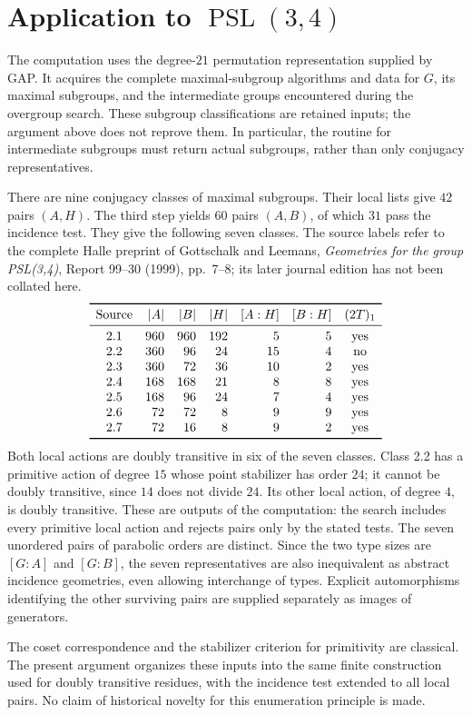 \documentclass[11pt]{article}
\begin{document}
\section*{Application to $\operatorname{PSL}(3,4)$}
The computation uses the degree-$21$ permutation representation supplied
by GAP. It acquires the complete maximal-subgroup algorithms and data for
$G$, its maximal subgroups, and the intermediate groups encountered during
the overgroup search. These subgroup classifications are retained inputs;
the argument above does not reprove them. In particular, the routine for
intermediate subgroups must return actual subgroups, rather than only
conjugacy representatives.

There are nine conjugacy classes of maximal subgroups. Their local lists
give $42$ pairs $(A,H)$. The third step yields $60$ pairs $(A,B)$, of which
$31$ pass the incidence test. They give the following seven classes.
The source labels refer to the complete Halle preprint of Gottschalk and
Leemans, \emph{Geometries for the group PSL(3,4)}, Report 99--30 (1999),
pp.~7--8; its later journal edition has not been collated here.
\[
\begin{array}{crrrrrc}
\toprule
\text{Source}&|A|&|B|&|H|&[A:H]&[B:H]&(2T)_1\\
\midrule
2.1&960&960&192&5&5&\mathrm{yes}\\
2.2&360&96&24&15&4&\mathrm{no}\\
2.3&360&72&36&10&2&\mathrm{yes}\\
2.4&168&168&21&8&8&\mathrm{yes}\\
2.5&168&96&24&7&4&\mathrm{yes}\\
2.6&72&72&8&9&9&\mathrm{yes}\\
2.7&72&16&8&9&2&\mathrm{yes}\\
\bottomrule
\end{array}
\]
Both local actions are doubly transitive in six of the seven classes.
Class 2.2 has a primitive action of degree $15$ whose point stabilizer
has order $24$; it cannot be doubly transitive, since $14$ does not
divide $24$. Its other local action, of degree $4$, is doubly transitive.
These are outputs of the computation: the search includes every primitive
local action and rejects pairs only by the stated tests. The seven
unordered pairs of parabolic orders are distinct. Since the two type
sizes are $[G:A]$ and $[G:B]$, the seven representatives are also
inequivalent as abstract incidence geometries, even allowing interchange
of types. Explicit automorphisms identifying the other surviving pairs
are supplied separately as images of generators.

The coset correspondence and the stabilizer criterion for primitivity
are classical. The present argument organizes these inputs into the same
finite construction used for doubly transitive residues, with the
incidence test extended to all local pairs. No claim of historical
novelty for this enumeration principle is made.
\end{document}
